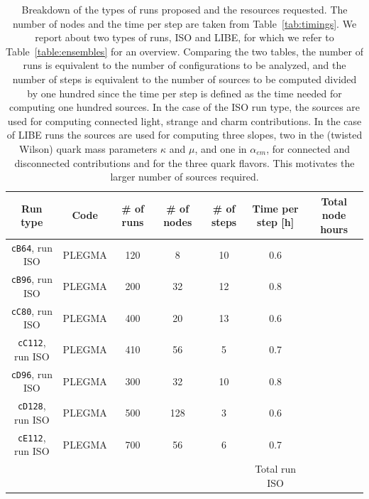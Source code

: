 \documentclass[a4paper,12pt]{article}
\newcommand{\hrsB}{0.6}
\newcommand{\hrsBL}{0.8}
\newcommand{\hrsC}{0.6}
\newcommand{\hrsCL}{0.7}
\newcommand{\hrsD}{0.8}
\newcommand{\hrsDL}{0.6}
\newcommand{\hrsE}{0.7}
\newcommand{\rAB}{120*8*10}
\newcommand{\rABL}{200*32*12}
\newcommand{\rAC}{400*20*13}
\newcommand{\rACL}{410*56*5}
\newcommand{\rAD}{300*32*10}
\newcommand{\rADL}{500*128*3}
\newcommand{\rAE}{700*56*6}
\begin{document}
\begin{table}[h!]
    \centering
    \small
    \caption{Breakdown of the types of runs proposed and the resources requested. The number of nodes and the time per step are taken from Table~\ref{tab:timings}. We report about two types of runs, ISO and LIBE, for which we refer to Table~\ref{table:ensembles} for an overview. Comparing the two tables, the number of runs is equivalent to the number of configurations to be analyzed, and the number of steps is equivalent to the number of sources to be computed divided by one hundred since the time per step is defined as the time needed for computing one hundred sources. In the case of the ISO run type, the sources are used for computing connected light, strange and charm contributions. In the case of LIBE runs the sources are used for computing three slopes, two in the (twisted Wilson) quark mass parameters $\kappa$ and $\mu$, and one in $\alpha_{em}$, for connected and disconnected contributions and for the three quark flavors. This motivates the larger number of sources required. } 
    \begin{tabular}{|c|c|c|c|c|c|c|}
      \hline\hline
      \textbf{Run type}                & \textbf{Code}        & \textbf{\# of runs}                 & \textbf{\# of nodes} & \textbf{\# of steps} & \textbf{Time per step [h]} & \textbf{Total node hours}                                        \\\hline
      \texttt{cB64}, run ISO & PLEGMA & 120 & 8 & 10 & \hrsB{} & \fpeval{\hrsB{}*\rAB{}} \\\hline
      \texttt{cB96}, run ISO & PLEGMA & 200 & 32 & 12 & \hrsBL{} & \fpeval{\hrsBL{}*\rABL{}} \\\hline
      \texttt{cC80}, run ISO & PLEGMA & 400 & 20 & 13 & \hrsC{} & \fpeval{\hrsC{}*\rAC{}} \\\hline
      \texttt{cC112}, run ISO & PLEGMA & 410 & 56 & 5 & \hrsCL{} & \fpeval{\hrsCL{}*\rACL{}} \\\hline
      \texttt{cD96}, run ISO & PLEGMA & 300 & 32 & 10 & \hrsD{} & \fpeval{\hrsD{}*\rAD{}} \\\hline
      \texttt{cD128}, run ISO & PLEGMA & 500 & 128 & 3 & \hrsDL{} & \fpeval{\hrsDL{}*\rADL{}} \\\hline
      \texttt{cE112}, run ISO & PLEGMA & 700 & 56 & 6 & \hrsE{} & \fpeval{\hrsE{}*\rAE{}} \\\hline
      \multicolumn{5}{r|}{}            & Total run ISO & \fpeval{\hrsB{}*\rAB{}+\hrsBL{}*\rABL{}+\hrsC{}*\rAC{}+\hrsCL{}*\rACL{}+\hrsD{}*\rAD{}+\hrsDL{}*\rADL{}+\hrsE{}*\rAE{}}                                                                                                                    \\\cline{6-7}

\end{tabular}
\end{table}
\end{document}
